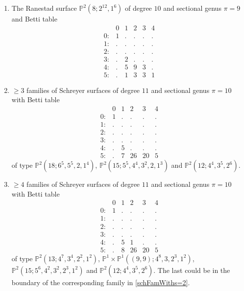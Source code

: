 \documentclass[twoside,12pt, leqno]{amsart}
\def\PP{{\mathbb P}}
\begin{document}
\begin{enumerate}
      
 \item The Ranestad surface $\PP^{2}(8;2^{12},1^{6})$ of degree $10$ and sectional genus $\pi=9$ and Betti table     
$$\begin{matrix}
        & 0 & 1 & 2 & 3 & 4\\
       0: & 1 & . & . & . & .\\
       1: & . & . & . & . & .\\
       2: & . & . & . & . & .\\
       3: & . & 2 & . & . & .\\
       4: & . & 5 & 9 & 3 & .\\
       5: & . & 1 & 3 & 3 & 1
       \end{matrix}$$


\item\label{schFamWiths=2} $\ge 3$ families of Schreyer surfaces of degree $11$ and sectional genus $\pi=10$ with Betti table
$$\begin{matrix}
       & 0 & 1 & 2 & 3 & 4\\
      0: & 1 & . & . & . & .\\
      1: & . & . & . & . & .\\
      2: & . & . & . & . & .\\
      3: & . & . & . & . & .\\
      4: & . & 5 & . & . & .\\
      5: & . & 7 & 26 & 20 & 5
      \end{matrix}$$
of type $\PP^{2}(18;6^{5},5^{5},2,1^{4})$, $\PP^{2}(15;5^{5},4^{4},3^{2},2,1^{3})$ and $\PP^{2}(12;4^{4},3^{5},2^{6})$.


\item $\ge 4$ families of Schreyer surfaces of  degree $11$ and sectional genus $\pi=10$ with Betti table
$$\begin{matrix}
       & 0 & 1 & 2 & 3 & 4\\
      0: & 1 & . & . & . & .\\
      1: & . & . & . & . & .\\
      2: & . & . & . & . & .\\
      3: & . & . & . & . & .\\
      4: & . & 5 & 1 & . & .\\
      5: & . & 8 & 26 & 20 & 5
      \end{matrix}$$
of type $\PP^{2}(13;4^{7},3^{4},2^{2},1^{2})$, $\PP^{1}\times \PP^{1}((9,9);4^{8},3,2^{3},1^{2})$, $\PP^{2}(15;5^{6},4^{2},3^{2},2^{3},1^{2})$ and 
$\PP^{2}(12;4^{4},3^{5},2^{6})$. The last could be in the boundary of the corresponding family in \ref{schFamWiths=2}.
 

\end{enumerate}
\end{document}
